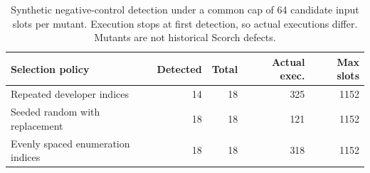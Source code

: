 \begin{table}[t]
\caption{Synthetic negative-control detection under a common cap of 64 candidate input slots per mutant. Execution stops at first detection, so actual executions differ. Mutants are not historical Scorch defects.}\label{tab:mutation}
\centering
\begin{tabular}{lrrrr}
\toprule
Selection policy & Detected & Total & Actual exec. & Max slots\\\midrule
Repeated developer indices & 14 & 18 & 325 & 1152\\
Seeded random with replacement & 18 & 18 & 121 & 1152\\
Evenly spaced enumeration indices & 18 & 18 & 318 & 1152\\
\bottomrule
\end{tabular}
\end{table}
